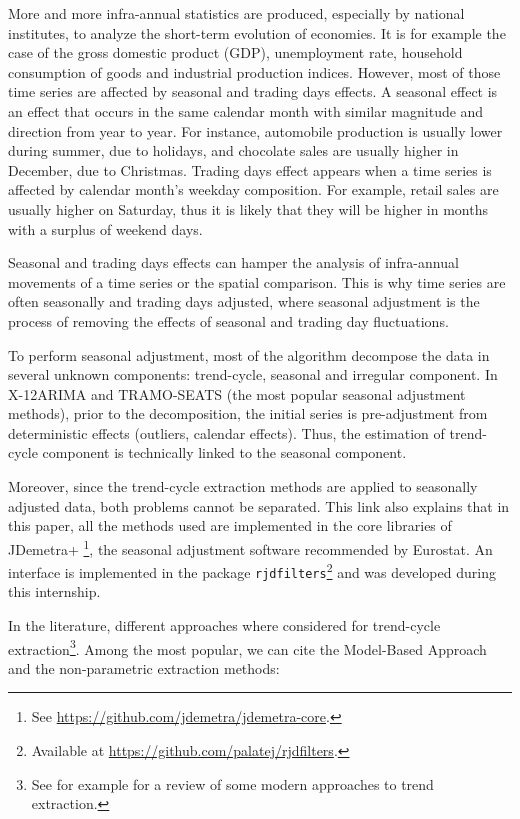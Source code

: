 \documentclass[
  12pt,
  ,
  a4paper]{article}
\newcommand\1{\mathds{1}}
\begin{document}
More and more infra-annual statistics are produced, especially by national institutes, to analyze the short-term evolution of economies.
It is for example the case of the gross domestic product (GDP), unemployment rate, household consumption of goods and industrial production indices.
However, most of those time series are affected by seasonal and trading days effects.
A seasonal effect is an effect that occurs in the same calendar month with similar magnitude and direction from year to year.
For instance, automobile production is usually lower during summer, due to holidays, and chocolate sales are usually higher in December, due to Christmas.
Trading days effect appears when a time series is affected by calendar month's weekday composition.
For example, retail sales are usually higher on Saturday, thus it is likely that they will be higher in months with a surplus of weekend days.

Seasonal and trading days effects can hamper the analysis of infra-annual movements of a time series or the spatial comparison.
This is why time series are often seasonally and trading days adjusted, where seasonal adjustment is the process of removing the effects of seasonal and trading day fluctuations.

To perform seasonal adjustment, most of the algorithm decompose the data in several unknown components: trend-cycle, seasonal and irregular component.
In X-12ARIMA and TRAMO-SEATS (the most popular seasonal adjustment methods), prior to the decomposition, the initial series is pre-adjustment from deterministic effects (outliers, calendar effects).
Thus, the estimation of trend-cycle component is technically linked to the seasonal component.

Moreover, since the trend-cycle extraction methods are applied to seasonally adjusted data, both problems cannot be separated.
This link also explains that in this paper, all the methods used are implemented in the core libraries of JDemetra+ \footnote{See \url{https://github.com/jdemetra/jdemetra-core}.}, the seasonal adjustment software recommended by Eurostat.
An  interface is implemented in the package \texttt{rjdfilters}\footnote{Available at \url{https://github.com/palatej/rjdfilters}.} and was developed during this internship.

In the literature, different approaches where considered for trend-cycle extraction\footnote{See for example \textcite{alexandrov2012TEreview} for a review of some modern approaches to trend extraction.}.
Among the most popular, we can cite the Model-Based Approach and the non-parametric extraction methods:
\end{document}
